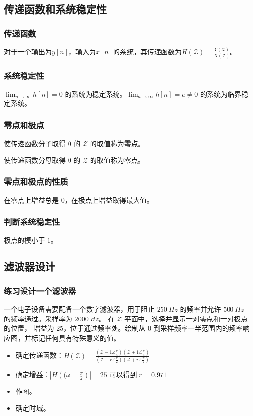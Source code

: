 \documentclass{ctexbeamer}
\begin{document}
	\subsection{传递函数和系统稳定性}
	\begin{frame}
			\frametitle{传递函数}
			\begin{definition}[传递函数]
			对于一个输出为$y[n]$，输入为$x[n]$的系统，其传递函数为$H(\mathcal{Z})=\frac{Y(\mathcal{Z})}{X(\mathcal{Z})}$。
		\end{definition}
	\end{frame}
	\begin{frame}
			\frametitle{系统稳定性}
			\begin{definition}[系统稳定性]
			$\lim_{n\rightarrow\infty}h[n]=0$ 的系统为稳定系统。$\lim_{n\rightarrow\infty}h[n]=a\neq0$ 的系统为临界稳定系统。 
			\end{definition}
	\end{frame}
	\begin{frame}
			\frametitle{零点和极点}
			\begin{definition}[零点]
			使传递函数分子取得 $0$ 的 $\mathcal{Z}$ 的取值称为零点。
			\end{definition}
			\begin{definition}[极点]
			使传递函数分母取得 $0$ 的 $\mathcal{Z}$ 的取值称为零点。
			\end{definition}
	\end{frame}
	\begin{frame}
			\frametitle{零点和极点的性质}
			在零点上增益总是 $0$，在极点上增益取得最大值。
	\end{frame}
	\begin{frame}
			\frametitle{判断系统稳定性}
			极点的模小于  $1$。
	\end{frame}
	\subsection{滤波器设计}
	\begin{frame}[allowframebreaks]
			\frametitle{练习设计一个滤波器}
			\begin{problem}
				一个电子设备需要配备一个数字滤波器，用于阻止 $\SI{250}{Hz}$ 的频率并允许 $\SI{500}{Hz}$ 的频率通过。采样率为 $\SI{2000}{Hz}$。
在 $\mathcal{Z}$ 平面中，选择并显示一对零点和一对极点的位置，
增益为 $25$，位于通过频率处。绘制从 0 到采样频率一半范围内的频率响应图，并标记任何具有特殊意义的值。
			\end{problem}
			\begin{solution}
				\begin{itemize}
					\item 确定传递函数：$H(\mathcal{Z})=\frac{\left(\mathcal{Z}-1\angle \frac{\pi}{4}\right)\left(\mathcal{Z}+1\angle \frac{\pi}{4}\right)}{\left(\mathcal{Z}-r\angle \frac{\pi}{2}\right)\left(\mathcal{Z}+r\angle \frac{\pi}{2}\right)}$
					\item 确定增益：$\left|H\left((\omega=\frac{\pi}{2}\right)\right|=25$ 可以得到 $r=0.971$
					\item 作图。
					\item 确定时域。
				\end{itemize}				
			\end{solution}
	\end{frame}
	
\end{document}
